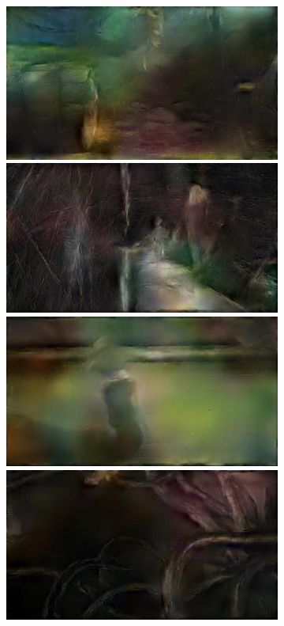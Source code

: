 \begin{figure}
\begin{subfigure}[t]{0.135\textwidth}
		\includegraphics[width=\textwidth]{figures/stereo/bbb_frame-0353-4}\\
		\includegraphics[width=\textwidth]{figures/stereo/ed_frame-0097-4}\\
		\includegraphics[width=\textwidth]{figures/stereo/ed_frame-0438-4}\\
		\includegraphics[width=\textwidth]{figures/stereo/ed_frame-0528-4}

\end{subfigure}
\end{figure}

